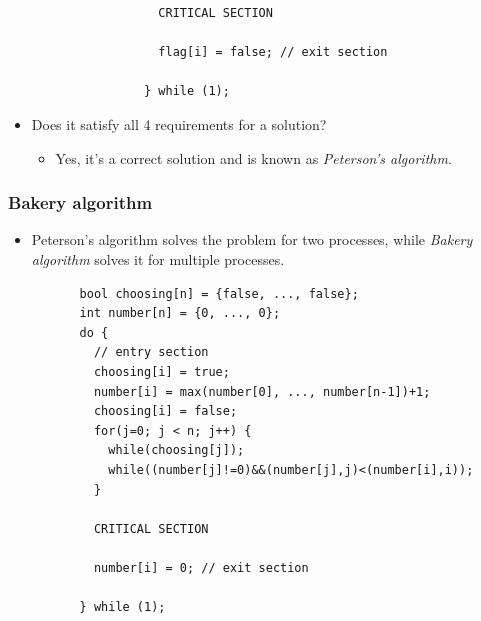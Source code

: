 \documentclass[CJKutf8,xcolor=pdftex,dvipsnames,table]{beamer}
\begin{document}
\begin{CJK*}{UTF8}{song}
\begin{frame}[fragile]
\begin{lstlisting}
                     CRITICAL SECTION

                     flag[i] = false; // exit section

                   } while (1);
\end{lstlisting}

  \begin{itemize}
  \item{Does it satisfy all 4 requirements for a solution?} \pause
    \begin{itemize}
    \item{Yes, it's a correct solution and is known as \emph{Peterson's algorithm}.}
    \end{itemize}
  \end{itemize}
\end{frame}

  \begin{frame}[fragile]
  \frametitle{Bakery algorithm} \pause
  \begin{itemize}
  \item{Peterson's algorithm solves the problem for two processes, while \emph{Bakery algorithm} solves it for multiple processes.} \pause
  \end{itemize}

\begin{lstlisting}
          bool choosing[n] = {false, ..., false};
          int number[n] = {0, ..., 0};
          do {
            // entry section
            choosing[i] = true;
            number[i] = max(number[0], ..., number[n-1])+1;
            choosing[i] = false;
            for(j=0; j < n; j++) {
              while(choosing[j]);
              while((number[j]!=0)&&(number[j],j)<(number[i],i));
            }

            CRITICAL SECTION

            number[i] = 0; // exit section

          } while (1);
\end{lstlisting}

\end{frame}


\end{CJK*}
\end{document}
